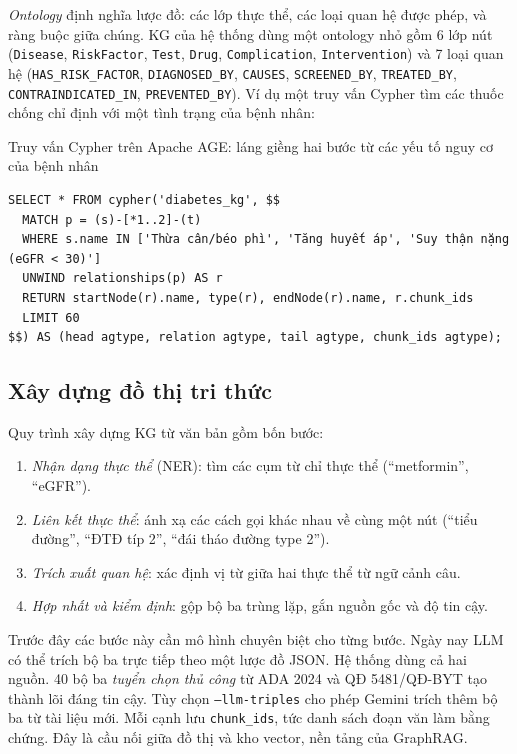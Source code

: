\emph{Ontology} định nghĩa lược đồ: các lớp thực thể, các loại quan hệ được phép, và ràng buộc giữa chúng. KG của hệ thống dùng một ontology nhỏ gồm 6 lớp nút (\texttt{Disease}, \texttt{RiskFactor}, \texttt{Test}, \texttt{Drug}, \texttt{Complication}, \texttt{Intervention}) và 7 loại quan hệ (\texttt{HAS\_RISK\_FACTOR}, \texttt{DIAGNOSED\_BY}, \texttt{CAUSES}, \texttt{SCREENED\_BY}, \texttt{TREATED\_BY}, \texttt{CONTRAINDICATED\_IN}, \texttt{PREVENTED\_BY}). Ví dụ một truy vấn Cypher tìm các thuốc chống chỉ định với một tình trạng của bệnh nhân:

\begin{code}{Truy vấn Cypher trên Apache AGE: láng giềng hai bước từ các yếu tố nguy cơ của bệnh nhân}
\label{lst:ch5-cypher}
\begin{verbatim}
SELECT * FROM cypher('diabetes_kg', $$
  MATCH p = (s)-[*1..2]-(t)
  WHERE s.name IN ['Thừa cân/béo phì', 'Tăng huyết áp', 'Suy thận nặng (eGFR < 30)']
  UNWIND relationships(p) AS r
  RETURN startNode(r).name, type(r), endNode(r).name, r.chunk_ids
  LIMIT 60
$$) AS (head agtype, relation agtype, tail agtype, chunk_ids agtype);
\end{verbatim}
\end{code}

\subsection{Xây dựng đồ thị tri thức}

Quy trình xây dựng KG từ văn bản gồm bốn bước:
\begin{enumerate}
  \item \emph{Nhận dạng thực thể} (NER): tìm các cụm từ chỉ thực thể (``metformin'', ``eGFR'').
  \item \emph{Liên kết thực thể}: ánh xạ các cách gọi khác nhau về cùng một nút (``tiểu đường'', ``ĐTĐ típ 2'', ``đái tháo đường type 2'').
  \item \emph{Trích xuất quan hệ}: xác định vị từ giữa hai thực thể từ ngữ cảnh câu.
  \item \emph{Hợp nhất và kiểm định}: gộp bộ ba trùng lặp, gắn nguồn gốc và độ tin cậy.
\end{enumerate}
Trước đây các bước này cần mô hình chuyên biệt cho từng bước. Ngày nay LLM có thể trích bộ ba trực tiếp theo một lược đồ JSON. Hệ thống dùng cả hai nguồn. 40 bộ ba \emph{tuyển chọn thủ công} từ ADA 2024 và QĐ 5481/QĐ-BYT tạo thành lõi đáng tin cậy. Tùy chọn \texttt{--llm-triples} cho phép Gemini trích thêm bộ ba từ tài liệu mới. Mỗi cạnh lưu \texttt{chunk\_ids}, tức danh sách đoạn văn làm bằng chứng. Đây là cầu nối giữa đồ thị và kho vector, nền tảng của GraphRAG.

